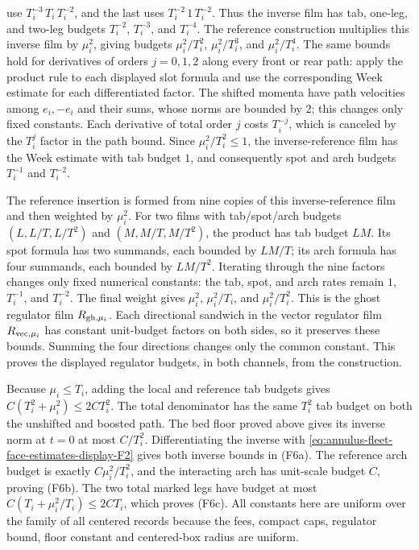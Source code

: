 use $T_i^{-3}\,T_i\,T_i^{-2}$, and the last uses
$T_i^{-2}\,1\,T_i^{-2}$. Thus the inverse film has tab, one-leg, and
two-leg budgets $T_i^{-2}$, $T_i^{-3}$, and $T_i^{-4}$. The reference
construction multiplies this inverse film by $\mu_i^2$, giving budgets
$\mu_i^2/T_i^2$, $\mu_i^2/T_i^3$, and $\mu_i^2/T_i^4$. The same
bounds hold for derivatives of orders $j=0,1,2$ along every front or
rear path: apply the product rule to each displayed slot formula and use
the corresponding Week estimate for each differentiated factor. The
shifted momenta have path velocities among $e_i,-e_i$ and their sums,
whose norms are bounded by $2$; this changes only fixed constants. Each
derivative of total order $j$ costs $T_i^{-j}$, which is canceled by
the $T_i^j$ factor in the path bound. Since
$\mu_i^2/T_i^2\leq1$, the inverse-reference film has the Week estimate
with tab budget $1$, and consequently spot and arch budgets
$T_i^{-1}$ and $T_i^{-2}$.

The reference insertion is formed from nine copies of this
inverse-reference film and then weighted by $\mu_i^2$. For two films
with tab/spot/arch budgets $(L,L/T,L/T^2)$ and $(M,M/T,M/T^2)$, the
product has tab budget $LM$. Its spot formula has two summands, each
bounded by $LM/T$; its arch formula has four summands, each bounded by
$LM/T^2$. Iterating through the nine factors changes only fixed
numerical constants: the tab, spot, and arch rates remain $1$, $T_i^{-1}$,
and $T_i^{-2}$. The final weight gives $\mu_i^2$,
$\mu_i^2/T_i$, and $\mu_i^2/T_i^2$.
This is the ghost regulator film $R_{{\rm gh},\mu_i}$. Each directional
sandwich in the vector regulator film $R_{{\rm vec},\mu_i}$ has constant
unit-budget factors on both sides, so it preserves these bounds.
Summing the four directions changes only the common constant. This
proves the displayed regulator budgets, in both channels, from the
construction.

Because $\mu_i\leq T_i$, adding the local and reference tab budgets gives
$C(T_i^2+\mu_i^2)\leq 2C T_i^2$. The total denominator has the same
$T_i^2$ tab budget on both the unshifted and boosted path. The bed floor
proved above gives its inverse norm at $t=0$ at most $C/T_i^2$.
Differentiating the inverse with \eqref{eq:annulus-fleet-face-estimates-display-F2} gives both inverse bounds in
(F6a). The reference arch budget is exactly $C\mu_i^2/T_i^2$, and the
interacting arch has unit-scale budget $C$, proving (F6b). The two total
marked legs have budget at most
$C(T_i+\mu_i^2/T_i)\leq2C T_i$, which proves (F6c). All constants here
are uniform over the family of all centered records because the fees, compact
caps, regulator bound, floor constant and centered-box radius are uniform.

